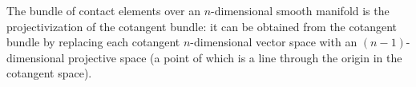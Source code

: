 The bundle of contact elements over an $n$-dimensional smooth manifold is the projectivization of the cotangent bundle: it can be obtained from the cotangent bundle by replacing each cotangent $n$-dimensional vector space with an $(n-1)$-dimensional projective space (a point of which is a line through the origin in the cotangent space).
